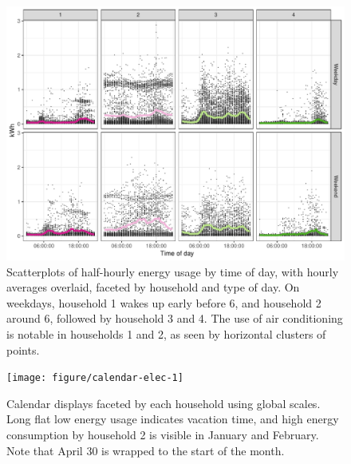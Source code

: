 \documentclass[12pt]{article}
\begin{document}
\begin{figure}

{\centering \includegraphics[width=\textwidth]{figure/hod-1} 

}

\caption{Scatterplots of half-hourly energy usage by time of day, with hourly averages overlaid, faceted by household and type of day. On weekdays, household 1 wakes up early before 6, and household 2 around 6, followed by household 3 and 4. The use of air conditioning is notable in households 1 and 2, as seen by horizontal clusters of points.}\label{fig:hod}
\end{figure}



\begin{figure}

{\centering \texttt{[image: figure/calendar-elec-1]} 

}

\caption{Calendar displays faceted by each household using global scales. Long flat low energy usage indicates vacation time, and high energy consumption by household 2 is visible in January and February. Note that April 30 is wrapped to the start of the month.}\label{fig:calendar-elec}
\end{figure}
\end{document}
